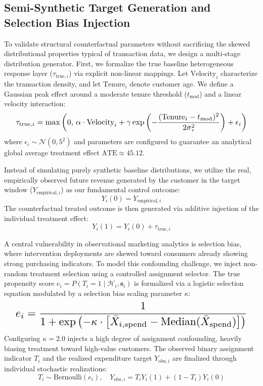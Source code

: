 \documentclass[10pt, conference]{IEEEtran}
\begin{document}
\subsection{Semi-Synthetic Target Generation and Selection Bias Injection}
To validate structural counterfactual parameters without sacrificing the skewed distributional properties typical of transaction data, we design a multi-stage distribution generator. First, we formalize the true baseline heterogeneous response layer ($\tau_{\text{true}, i}$) via explicit non-linear mappings. Let $\text{Velocity}_i$ characterize the transaction density, and let $\text{Tenure}_i$ denote customer age. We define a Gaussian peak effect around a moderate tenure threshold ($t_{\text{mod}}$) and a linear velocity interaction:
\begin{equation}
\resizebox{0.95\columnwidth}{!}{$\displaystyle
\tau_{\text{true}, i} = \max\left(0, \, \alpha \cdot \text{Velocity}_i + \gamma \exp\left(-\frac{(\text{Tenure}_i - t_{\text{mod}})^2}{2\sigma_{\tau}^2}\right) + \epsilon_i \right)
$}
\end{equation}
where $\epsilon_i \sim \mathcal{N}(0, 5^2)$ and parameters are configured to guarantee an analytical global average treatment effect $\text{ATE} \approx 45.12$. 

Instead of simulating purely synthetic baseline distributions, we utilize the real, empirically observed future revenue generated by the customer in the target window ($Y_{\text{empirical}, i}$) as our fundamental control outcome:
\begin{equation}
Y_i(0) = Y_{\text{empirical}, i}
\end{equation}
The counterfactual treated outcome is then generated via additive injection of the individual treatment effect:
\begin{equation}
Y_i(1) = Y_i(0) + \tau_{\text{true}, i}
\end{equation}

A central vulnerability in observational marketing analytics is selection bias, where intervention deployments are skewed toward consumers already showing strong purchasing indicators. To model this confounding challenge, we inject non-random treatment selection using a controlled assignment selector. The true propensity score $e_i = P(T_i = 1 \mid \mathcal{H}_i, \mathbf{s}_i)$ is formalized via a logistic selection equation modulated by a selection bias scaling parameter $\kappa$:
\begin{equation}
\resizebox{0.95\columnwidth}{!}{$\displaystyle
e_i = \frac{1}{1 + \exp\left(-\kappa \cdot \left[\bar{X}_{i, \text{spend}} - \text{Median}(\bar{X}_{\text{spend}})\right]\right)}
$}
\end{equation}
Configuring $\kappa = 2.0$ injects a high degree of assignment confounding, heavily biasing treatment toward high-value customers. The observed binary assignment indicator $T_i$ and the realized expenditure target $Y_{\text{obs}, i}$ are finalized through individual stochastic realizations:
\begin{equation}
T_i \sim \text{Bernoulli}(e_i), \quad Y_{\text{obs}, i} = T_i Y_i(1) + (1 - T_i) Y_i(0)
\end{equation}
\end{document}
